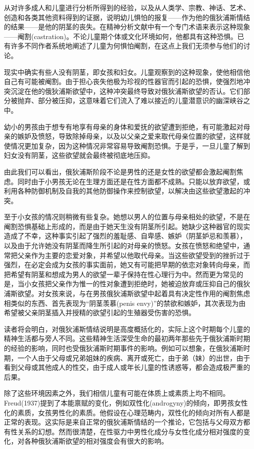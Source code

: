 \documentclass[UTF8,10pt,a4paper,openany]{book}
\begin{document}
从对许多成人和儿童进行分析所得到的经验，以及从人类学、宗教、神话、艺术、创造和各类其他资料得到的证据，说明幼儿惧怕的报复——作为他的俄狄浦斯情结的结果——是他的阴茎的丧失。在精神分析文献中有一个专门术语来表示这种现象——阉割(castration)。不论儿童期个体或文化环境如何，他都具有这种恐惧。已有许多不同作者系统地阐述了儿童为何惧怕阉割，在这点上我们无须参与他们的讨论。

现实中确实有些人没有阴茎，即女孩和妇女。儿童观察到的这种现象，使他相信他自己有可能被阉割。由于担心丧失他极为珍视的性器官而引起的恐惧，使强烈地冲突沉淀在他的俄狄浦斯欲望中，这种冲突最终导致对俄狄浦斯欲望的否认。它们部分被抛弃、部分被压抑，这意味着它们流入了难以接近的儿童潜意识的幽深峡谷之中。

幼小的男孩由于想专有地享有母亲的身体和爱抚的欲望遭到拒绝，有可能激起对母亲的嫉妒及愤怒，导致除掉母亲，以及以父亲之爱来取代母亲位置的欲望，这样就使情况更加复杂，因为这种情况非常容易导致阉割恐惧。于是乎，一旦儿童了解到妇女没有阴茎，这些欲望就会最终被彻底地压抑。

由此我们可以看出，俄狄浦斯阶段不论是男性的还是女性的欲望都会激起阉割焦虑。同时由于小男孩无论在生理方面还是在性方面都不成熟。只能以放弃欲望，或利用各种防御机制及自我的其他防御操作来控制欲望，以解决由这些欲望激起的冲突。

至于小女孩的情况则稍微有些复杂。她想以男人的位置与母亲相处的欲望，不是在阉割恐惧基础上形成的，而是由于她天生没有阴茎所引起。她缺少这种器官的现实造成了不幸，这种事实引起了强烈的羞耻感、自卑感、嫉妒（阴茎妒忌和羡慕），以及由于允许她没有阴茎而降生所引起的对母亲的愤怒。女孩在愤怒和绝望中，通常把父亲作为主要的恋爱对象，并希望以他取代母亲。当这些欲望受到的挫折过于强烈，在必定会成为女孩的事实面前，她又有可能把早期的依恋对象转向母亲，而把希望有阴茎和想成为男人的欲望一辈子保持在性心理行为中。然而更为常见的是，当小女孩把父亲作为惟一的性对象遭到拒绝时，她被迫放弃或压抑自己的俄狄浦斯欲望。对女孩来说，与在男孩俄狄浦斯欲望中起着具有决定性作用的阉割焦虑相类似的东西、首先表现为“阴茎羡慕(penis envy)”的禁欲和嫉妒，其次表现为由希望被父亲阴茎插入并授精的欲望引起的生殖器受伤害的恐惧。

读者将会明白，对俄狄浦斯情结说明是高度概括化的，实际上这个时期每个儿童的精神生活都与旁人不同。这些精神生活深受生命的最初两年那些先于俄狄浦斯时期的经验的影响，同时也受俄狄浦斯时期事件的影响。例如可以想象，在俄狄浦斯时期，一个人由于父母或兄弟姐妹的疾病、离开或死亡，由于弟（妹）的出世，由于看到父母或其他成人的性交，由于成人或年长儿童的性诱惑等，都会造成极严重的后果。

除了这些环境因素之外，我们相信儿童有可能在体质上或素质上均不相同。Freud(1937)提到了本能禀赋的变化，例如双性化(androgyny)的倾向，即男孩女性化的素质，女孩男性化的素质。他假设在心理范畴内，双性化的倾向对所有人都是正常的表现。这实际是来自正常的俄狄浦斯情结的一个推论，它包括与父母双方都有性关系的幻想。然而很清楚，在性驱力中男性化成分与女性化成分相对强度的变化，对各种俄狄浦斯欲望的相对强度会有很大的影响。
\end{document}
